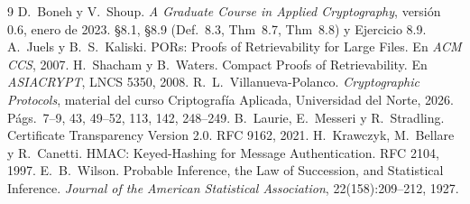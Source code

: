 \documentclass[11pt,a4paper]{article}
\begin{document}
\begin{thebibliography}{9}\small
{} D.~Boneh y V.~Shoup. \emph{A Graduate Course in Applied Cryptography}, versión 0.6,
  enero de 2023. §8.1, §8.9 (Def.~8.3, Thm~8.7, Thm~8.8) y Ejercicio 8.9.
 A.~Juels y B.~S.~Kaliski. PORs: Proofs of Retrievability for Large Files. En
  \emph{ACM CCS}, 2007.
 H.~Shacham y B.~Waters. Compact Proofs of Retrievability. En \emph{ASIACRYPT},
  LNCS 5350, 2008.
 R.~L.~Villanueva-Polanco. \emph{Cryptographic Protocols}, material del curso
  Criptografía Aplicada, Universidad del Norte, 2026. Págs.~7--9, 43, 49--52, 113, 142, 248--249.
 B.~Laurie, E.~Messeri y R.~Stradling. Certificate Transparency Version 2.0.
  RFC 9162, 2021.
 H.~Krawczyk, M.~Bellare y R.~Canetti. HMAC: Keyed-Hashing for Message
  Authentication. RFC 2104, 1997.
 E.~B.~Wilson. Probable Inference, the Law of Succession, and Statistical
  Inference. \emph{Journal of the American Statistical Association}, 22(158):209--212, 1927.
\end{thebibliography}
\end{document}
